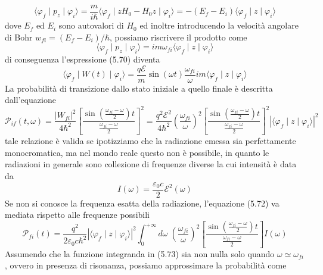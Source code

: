 \begin{equation*}
	\langle \varphi_f \mid p_z \mid \varphi_i \rangle = \frac{m}{i \hbar} \langle \varphi_f \mid zH_0 - H_0z \mid \varphi_i \rangle =-(E_f -E_i) \langle \varphi_f \mid z \mid \varphi_i \rangle 
\end{equation*}
dove $E_f$ ed $E_i$ sono autovalori di $H_0$ ed inoltre introducendo la velocit\`a angolare di Bohr $w_{fi} = (E_f - E_i)/\hbar$, possiamo riscrivere il prodotto come
\begin{equation*}
	\langle \varphi_f \mid p_z \mid \varphi_i \rangle = im\omega_{fi} \langle \varphi_{f} \mid z \mid \varphi_i \rangle 
\end{equation*}
di conseguenza l'espressione (5.70) diventa 
\begin{equation}
	\langle \varphi_{f} \mid W(t) \mid \varphi_i \rangle  = \frac{q \mathcal{E}}{m}\sin(\omega t) \frac{\omega_{fi}}{\omega}im\langle \varphi_{f} \mid z \mid \varphi_i \rangle
\end{equation}
La probabilit\`a di transizione dallo stato iniziale a quello finale \`e descritta dall'equazione
\begin{equation}
	\mathcal{P}_{if}(t,\omega) = \frac{|W_{fi}|^2}{4 \hbar^2} \left [ \frac{\sin(\frac{\omega_{fi}-\omega}{2})t}{\frac{\omega_{fi} - \omega}{2}}\right]^2 = \frac{q^2 \mathcal{E}^2}{4 \hbar^2}\left ( \frac{\omega_{fi}}{\omega}\right)^2\left [ \frac{\sin(\frac{\omega_{fi}-\omega}{2})t}{\frac{\omega_{fi} - \omega}{2}}\right]^2|\langle \varphi_f \mid z \mid \varphi_i \rangle|^2
\end{equation}
tale relazione \`e valida se ipotizziamo che la radiazione emessa sia perfettamente monocromatica, ma nel mondo reale questo non \`e possibile, in quanto le radiazioni in generale sono collezione di frequenze diverse la cui intensit\`a \`e data da 
\begin{equation*}
	I(\omega) = \frac{\varepsilon_0c}{2}\mathcal{E}^2(\omega)
\end{equation*}
Se non si conosce la frequenza esatta della radiazione, l'equazione (5.72) va mediata rispetto alle frequenze possibili
\begin{equation}
	\mathcal{P}_{fi}(t) = \frac{q^2}{2 \varepsilon_0 c \hbar^2}|\langle \varphi_{f} \mid z \mid \varphi_i \rangle|^2 \int_{0}^{+\infty} d \omega \;\left ( \frac{\omega_{fi}}{\omega}\right)^2\left [ \frac{\sin(\frac{\omega_{fi}-\omega}{2})t}{\frac{\omega_{fi} - \omega}{2}}\right]I(\omega)
\end{equation}
Assumendo che la funzione integranda in (5.73) sia non nulla solo quando $\omega \simeq \omega_{fi}$, ovvero in presenza di risonanza, possiamo approssimare la probabilit\`a come 
